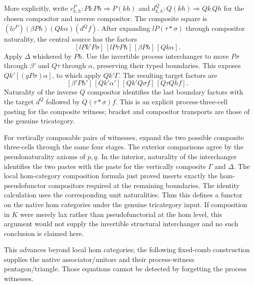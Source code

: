 \documentclass{article}
\begin{document}
More explicitly, write $c^P_{k,h}:Pk\,Ph\Rightarrow P(kh)$ and $d^Q_{k,h}:Q(kh)\Rightarrow Qk\,Qh$ for the chosen compositor and inverse compositor. The composite square is $(l c^P)(\beta Ph)(Qk\alpha)(d^Q f)$. After expanding $lP(\tau\ast\sigma)$ through compositor naturality, the central source has the factors
\[
 [lPk'P\sigma]\,[lP\tau Ph]\,[\beta Ph]\,[Qk\alpha].
\]
Apply $\Delta$ whiskered by $Ph$. Use the invertible process interchanger to move $P\sigma$ through $\beta'$ and $Q\tau$ through $\alpha$, preserving their typed boundaries. This exposes $Qk'[(gP\sigma)\alpha]$, to which apply $Qk'\Gamma$. The resulting target factors are
\[
 [\beta'Ph']\,[Qk'\alpha']\,[Qk'Q\sigma f]\,[Q\tau Qh f].
\]
Naturality of the inverse $Q$ compositor identifies the last boundary factors with the target $d^Q$ followed by $Q(\tau\ast\sigma)f$. This is an explicit process-three-cell pasting for the composite witness; bracket and compositor transports are those of the genuine tricategory.

For vertically composable pairs of witnesses, expand the two possible composite three-cells through the same four stages. The exterior comparisons agree by the pseudonaturality axioms of $p,q$. In the interior, naturality of the interchanger identifies the two pastes with the paste for the vertically composite $\Gamma$ and $\Delta$. The local hom-category composition formula just proved inserts exactly the hom-pseudofunctor compositors required at the remaining boundaries. The identity calculation uses the corresponding unit naturalities. Thus this defines a functor on the native hom categories under the genuine tricategory input. If composition in $K$ were merely lax rather than pseudofunctorial at the hom level, this argument would not supply the invertible structural interchanger and no such conclusion is claimed here.

This advances beyond local hom categories; the following fixed-comb construction supplies the native associator/unitors and their process-witness pentagon/triangle. Those equations cannot be detected by forgetting the process witnesses.
\end{document}
